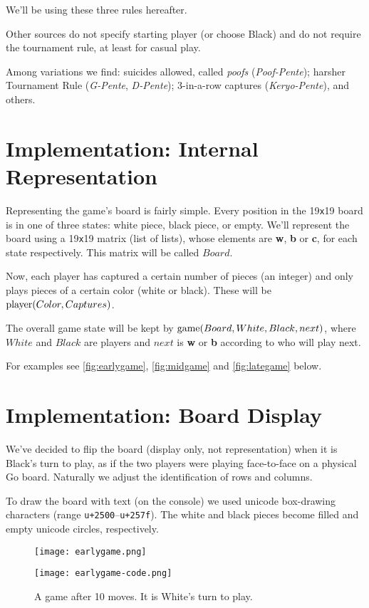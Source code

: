 \documentclass[12pt,a4paper,notitlepage]{article}
\newcommand*{\boardsize}[1]{#1\texttt{x}#1}
\begin{document}
We'll be using these three rules hereafter.

Other sources do not specify starting player (or choose Black) and do not require the tournament rule, at least for casual play. 

Among variations we find: suicides allowed, called \textit{poofs} (\textit{Poof-Pente}); harsher Tournament Rule (\textit{G-Pente}, \textit{D-Pente}); 3-in-a-row captures (\textit{Keryo-Pente}), and others.\supercite{pente-org,pente-net}

\section{Implementation: Internal Representation}

Representing the game's board is fairly simple. Every position in the \boardsize{19} board is in one of three states: white piece, black piece, or empty. We'll represent the board using a \boardsize{19} matrix (list of lists), whose elements are \textbf{w}, \textbf{b} or \textbf{c}, for each state respectively. This matrix will be called $Board$.

Now, each player has captured a certain number of pieces (an integer) and only plays pieces of a certain color (white or black). These will be $\textup{player}(Color, Captures)$.

The overall game state will be kept by $\textup{game}(Board, White, Black, next)$, where $White$ and $Black$ are players and $next$ is \textbf{w} or \textbf{b} according to who will play next.

For examples see \autoref{fig:earlygame}, \autoref{fig:midgame} and \autoref{fig:lategame} below.

\section{Implementation: Board Display}

We've decided to flip the board (display only, not representation) when it is Black's turn to play, as if the two players were playing face-to-face on a physical Go board. Naturally we adjust the identification of rows and columns.

To draw the board with text (on the console) we used unicode box-drawing characters (range \texttt{u+2500}--\texttt{u+257f}). The white and black pieces become filled and empty unicode circles, respectively.

\begin{figure}[bhtp]
	\begin{minipage}{0.45\textwidth}
	\texttt{[image: earlygame.png]}
	\end{minipage}
	\begin{minipage}{0.55\textwidth}
		\texttt{[image: earlygame-code.png]}
	\end{minipage}
	\caption{A game after 10 moves. It is White's turn to play.\label{fig:earlygame}}
\end{figure}
\end{document}
